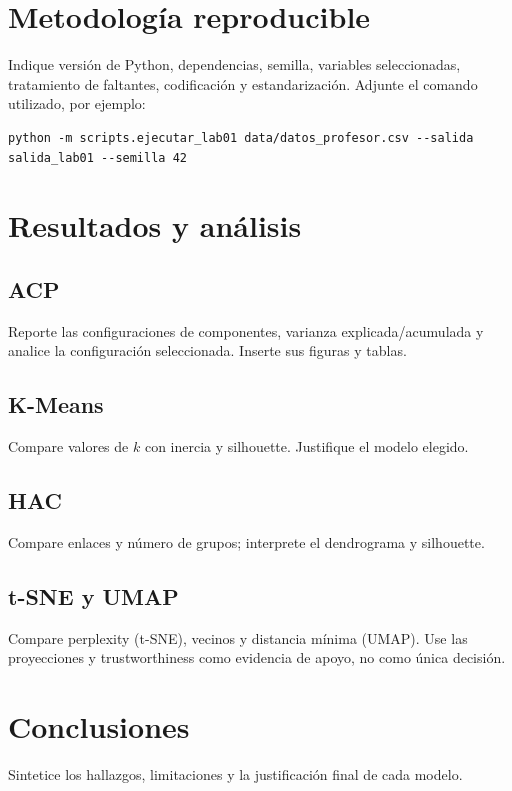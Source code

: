 \documentclass[11pt]{article}
\begin{document}
\section{Metodología reproducible}
Indique versión de Python, dependencias, semilla, variables seleccionadas,
tratamiento de faltantes, codificación y estandarización. Adjunte el comando
utilizado, por ejemplo:
\begin{verbatim}
python -m scripts.ejecutar_lab01 data/datos_profesor.csv --salida salida_lab01 --semilla 42
\end{verbatim}

\section{Resultados y análisis}
\subsection{ACP}
Reporte las configuraciones de componentes, varianza explicada/acumulada y
analice la configuración seleccionada. Inserte sus figuras y tablas.

\subsection{K-Means}
Compare valores de $k$ con inercia y silhouette. Justifique el modelo elegido.

\subsection{HAC}
Compare enlaces y número de grupos; interprete el dendrograma y silhouette.

\subsection{t-SNE y UMAP}
Compare perplexity (t-SNE), vecinos y distancia mínima (UMAP). Use las
proyecciones y trustworthiness como evidencia de apoyo, no como única decisión.

\section{Conclusiones}
Sintetice los hallazgos, limitaciones y la justificación final de cada modelo.



\end{document}
